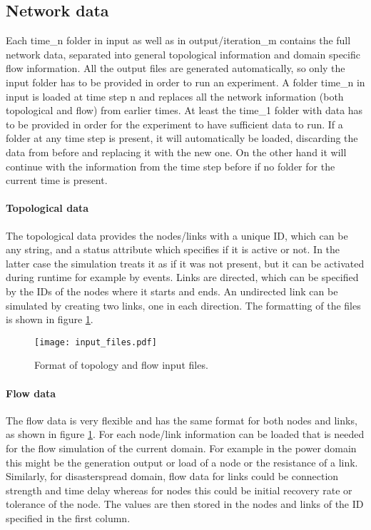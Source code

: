 \documentclass[11pt,fleqn]{book} %
\newcommand{\domain}[1][]{domain#1}
\begin{document}
\subsection{Network data}
Each time\_n folder in input as well as in output/iteration\_m contains the full network data, separated into general topological information and \domain{} specific flow information. All the output files are generated automatically, so only the input folder has to be provided in order to run an experiment. A folder time\_n in input is loaded at time step n and replaces all the network information (both topological and flow) from earlier times. At least the time\_1 folder with data has to be provided in order for the experiment to have sufficient data to run. If a folder at any time step is present, it will automatically be loaded, discarding the data from before and replacing it with the new one. On the other hand it will continue with the information from the time step before if no folder for the current time is present.

\paragraph{Topological data} The topological data provides the nodes/links with a unique ID, which can be any string, and a status attribute which specifies if it is active or not. In the latter case the simulation treats it as if it was not present, but it can be activated during runtime for example by events. Links are directed, which can be specified by the IDs of the nodes where it starts and ends. An undirected link can be simulated by creating two links, one in each direction. The formatting of the files is shown in figure \ref{fig:input_files}.

\begin{figure}[!h]
\centering\texttt{[image: input\_files.pdf]}
\caption{Format of topology and flow input files.}
\label{fig:input_files}
\end{figure}

\paragraph{Flow data} The flow data is very flexible and has the same format for both nodes and links, as shown in figure \ref{fig:input_files}. For each node/link information can be loaded that is needed for the flow simulation of the current \domain{}. For example in the power \domain{} this might be the generation output or load of a node or the resistance of a link. Similarly, for disaster\textunderscore spread \domain{}, flow data for links could be connection strength and time delay whereas for nodes this could be initial recovery rate or tolerance of the node. The values are then stored in the nodes and links of the ID specified in the first column.
\end{document}
